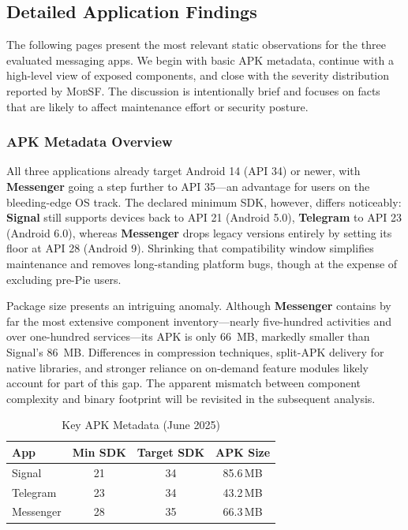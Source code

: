 \documentclass[a4paper,12pt]{report}
\begin{document}
\subsection{Detailed Application Findings}
The following pages present the most relevant static observations for the three
evaluated messaging apps.  We begin with basic APK metadata, continue with a
high-level view of exposed components, and close with the severity distribution
reported by \textsc{MobSF}.  The discussion is intentionally brief and focuses on
facts that are likely to affect maintenance effort or security posture.

\subsubsection{APK Metadata Overview}
All three applications already target Android 14 (API 34) or newer, with
\textbf{Messenger} going a step further to API 35—an advantage for users on the
bleeding-edge OS track.
The declared minimum SDK, however, differs noticeably:
\textbf{Signal} still supports devices back to API 21 (Android 5.0),
\textbf{Telegram} to API 23 (Android 6.0), whereas \textbf{Messenger} drops
legacy versions entirely by setting its floor at API 28 (Android 9).
Shrinking that compatibility window simplifies maintenance and removes
long-standing platform bugs, though at the expense of excluding pre-Pie users.

Package size presents an intriguing anomaly.
Although \textbf{Messenger} contains by far the most extensive component
inventory—nearly five-hundred activities and over one-hundred services—its APK
is only \SI{66}{MB}, markedly smaller than Signal’s \SI{86}{MB}.
Differences in compression techniques, split-APK delivery for native libraries,
and stronger reliance on on-demand feature modules likely account for part of
this gap.  The apparent mismatch between component complexity and binary
footprint will be revisited in the subsequent analysis.

\begin{table}[htbp]
  \centering
  \caption{Key APK Metadata (June 2025)}
  \label{tab:metadata}
  \begin{tabular}{|l|c|c|c|}
    \hline
    \textbf{App} & \textbf{Min SDK} & \textbf{Target SDK} & \textbf{APK Size} \\ \hline
    Signal    & 21 & 34 & 85.6\,MB \\ \hline
    Telegram  & 23 & 34 & 43.2\,MB \\ \hline
    Messenger & 28 & 35 & 66.3\,MB \\ \hline
  \end{tabular}
\end{table}
\end{document}
